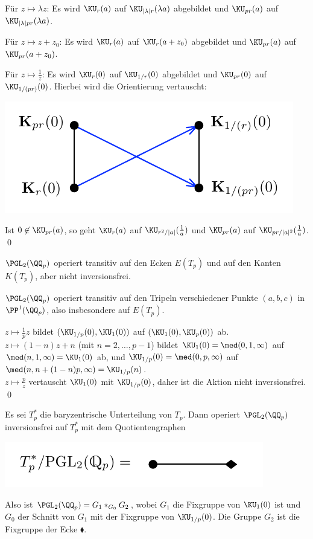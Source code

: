 \begin{itemize}
Für $z\mapsto \lambda z$: Es wird $\KU_r(a)$ auf
$\KU_{|\lambda|r}(\lambda a)$ abgebildet und $\KU_{pr}(a)$ auf
$\KU_{|\lambda|pr}(\lambda a)$.

Für $z\mapsto z+z_0$: Es wird $\KU_r(a)$ auf $\KU_r(a+z_0)$
abgebildet und $\KU_{pr}(a)$ auf $\KU_{pr}(a+z_0)$.

Für $z\mapsto\frac{1}{z}$: Es wird $\KU_r(0)$ auf
$\KU_{1/r}(0)$ abgebildet und $\KU_{pr}(0)$ auf
$\KU_{1/(pr)}(0)$. Hierbei wird die Orientierung vertauscht:
\begin{center}
	\includegraphics{grugraImages/vertauscht}
\end{center}
Ist $0\not\in \KU_{pr}(a)$, so geht $\KU_{r}(a)$ auf
$\KU_{r^2/|a|}(\frac{1}{a})$ und $\KU_{pr}(a)$ auf
$\KU_{pr/|a|^2}(\frac{1}{a})$.
\qed
\end{itemize}

\BEM $\PGL_2(\QQ_p)$ operiert transitiv auf den Ecken $E(T_p)$
und auf den Kanten $K(T_p)$, aber nicht inversionsfrei.

\bew $\PGL_2(\QQ_p)$ operiert transitiv auf den Tripeln verschiedener
Punkte $(a,b,c)$ in $\PP^1(\QQ_p)$, also insbesondere auf $E(T_p)$.

$z\mapsto \frac{1}{p}z$ bildet $(\KU_{1/p}(0),\KU_1(0))$ auf
$(\KU_1(0),\KU_p(0))$ ab.\\
$z\mapsto (1-n)z+n$ (mit $n=2,\ldots,p-1$) bildet
$\KU_1(0)=\med(0,1,\infty)$ auf $\med(n,1,\infty)=\KU_1(0)$ ab,
und $\KU_{1/p}(0)=\med(0,p,\infty)$ auf $\med(n,n+(1-n)p,\infty)
=\KU_{1/p}(n)$.\\
$z\mapsto \frac{p}{z}$ vertauscht $\KU_1(0)$ mit $\KU_{1/p}(0)$,
daher ist die Aktion nicht inversionsfrei.
\qed

\FOLG Es sei $T_p^*$ die baryzentrische Unterteilung von $T_p$.
Dann operiert $\PGL_2(\QQ_p)$ inversionsfrei auf $T_p^*$ mit dem
Quotientengraphen
\begin{center}
	\includegraphics{grugraImages/pglQuotient}
\end{center}
Also ist $\PGL_2(\QQ_p) = G_1 *_{G_0} G_2$, wobei $G_1$ die Fixgruppe
von $\KU_1(0)$ ist und $G_0$ der Schnitt von $G_1$ mit
der Fixgruppe
von $\KU_{1/p}(0)$. Die Gruppe $G_2$ ist die Fixgruppe der Ecke
$\blacklozenge$.

